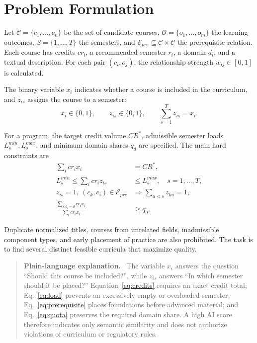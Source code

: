 \documentclass[twoside,11pt]{article}
\newcommand{\Ccal}{\mathcal{C}}
\newcommand{\Ocal}{\mathcal{O}}
\newcommand{\Ecal}{\mathcal{E}}
\newenvironment{plainbox}{\begin{quote}\small\noindent\textbf{Plain-language explanation.}\ }{\end{quote}}
\begin{document}
\section{Problem Formulation}

Let $\Ccal=\{c_1,\ldots,c_n\}$ be the set of candidate courses, $\Ocal=\{o_1,\ldots,o_m\}$ the learning outcomes, $S=\{1,\ldots,T\}$ the semesters, and $\Ecal_{pre}\subseteq\Ccal\times\Ccal$ the prerequisite relation. Each course has credits $cr_i$, a recommended semester $r_i$, a domain $d_i$, and a textual description. For each pair $(c_i,o_j)$, the relationship strength $w_{ij}\in[0,1]$ is calculated.

The binary variable $x_i$ indicates whether a course is included in the curriculum, and $z_{is}$ assigns the course to a semester:
\begin{equation}
  x_i\in\{0,1\},\qquad z_{is}\in\{0,1\},\qquad
  \sum_{s=1}^{T} z_{is}=x_i.
  \label{eq:variables}
\end{equation}

For a program, the target credit volume $CR^\ast$, admissible semester loads $L_s^{min},L_s^{max}$, and minimum domain shares $q_d$ are specified. The main hard constraints are
\begin{align}
  \sum_i cr_i x_i &= CR^\ast, \label{eq:credits}\\
  L_s^{min}\le \sum_i cr_i z_{is} &\le L_s^{max}, \quad s=1,\ldots,T, \label{eq:load}\\
  z_{is}=1,\ (c_k,c_i)\in\Ecal_{pre}
  &\Rightarrow \sum_{u<s}z_{ku}=1, \label{eq:prerequisite}\\
  \frac{\sum_{i:d_i=d}cr_i x_i}{\sum_i cr_i x_i} &\ge q_d. \label{eq:quota}
\end{align}

Duplicate normalized titles, courses from unrelated fields, inadmissible component types, and early placement of practice are also prohibited. The task is to find several distinct feasible curricula that maximize quality.

\begin{plainbox}
The variable $x_i$ answers the question ``Should this course be included?'', while $z_{is}$ answers ``In which semester should it be placed?'' Equation~\eqref{eq:credits} requires an exact credit total; Eq.~\eqref{eq:load} prevents an excessively empty or overloaded semester; Eq.~\eqref{eq:prerequisite} places foundations before advanced material; and Eq.~\eqref{eq:quota} preserves the required domain share. A high AI score therefore indicates only semantic similarity and does not authorize violations of curriculum or regulatory rules.
\end{plainbox}
\end{document}
